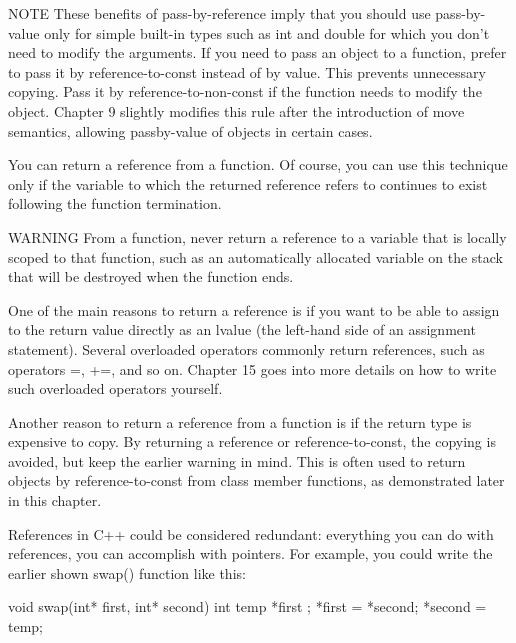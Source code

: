 \begin{myNotic}{NOTE}
These benefits of pass-by-reference imply that you should use pass-by-value only for simple built-in types such as int and double for which you don’t need to modify the arguments. If you need to pass an object to a function, prefer to pass it by reference-to-const instead of by value. This prevents unnecessary copying. Pass it by reference-to-non-const if the function needs to modify the object. Chapter 9 slightly modifies this rule after the introduction of move semantics, allowing passby-value of objects in certain cases.
\end{myNotic}


You can return a reference from a function. Of course, you can use this technique only if the variable to which the returned reference refers to continues to exist following the function termination.

\begin{myWarning}{WARNING}
From a function, never return a reference to a variable that is locally scoped to that function, such as an automatically allocated variable on the stack that will be destroyed when the function ends.
\end{myWarning}

One of the main reasons to return a reference is if you want to be able to assign to the return value directly as an lvalue (the left-hand side of an assignment statement). Several overloaded operators commonly return references, such as operators =, +=, and so on. Chapter 15 goes into more details on how to write such overloaded operators yourself.

Another reason to return a reference from a function is if the return type is expensive to copy. By returning a reference or reference-to-const, the copying is avoided, but keep the earlier warning in mind. This is often used to return objects by reference-to-const from class member functions, as demonstrated later in this chapter.


References in C++ could be considered redundant: everything you can do with references, you can accomplish with pointers. For example, you could write the earlier shown swap() function like this:

\begin{cpp}
void swap(int* first, int* second)
{
    int temp { *first };
    *first = *second;
    *second = temp;
}
\end{cpp}

